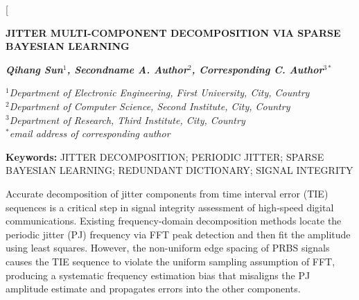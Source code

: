 \documentclass[10pt, a4paper, twocolumn]{article}
\begin{document}
\twocolumn[{

    \begin{center}
      {\fontsize{18pt}{20pt}\selectfont\textbf{JITTER MULTI-COMPONENT DECOMPOSITION VIA SPARSE BAYESIAN LEARNING}\par}

      \vspace{1.5em}

      {\fontsize{10pt}{12pt}\selectfont\textit{\textbf{Qihang Sun$^{1}$, Secondname A. Author$^{2}$, Corresponding C. Author$^{3*}$}}\par}

      \vspace{1em}

      {\fontsize{10pt}{12pt}\selectfont\textit{$^{1}$Department of Electronic Engineering, First University, City, Country\\
      $^{2}$Department of Computer Science, Second Institute, City, Country\\
      $^{3}$Department of Research, Third Institute, City, Country\\
      $^{*}$email address of corresponding author}\par}
    \end{center}

    \vspace{1.5em}

    \noindent\textbf{Keywords:} JITTER DECOMPOSITION; PERIODIC JITTER; SPARSE BAYESIAN LEARNING; REDUNDANT DICTIONARY; SIGNAL INTEGRITY\par

    \vspace{1.5em}

    \par
    \vspace{0.4em}

    \noindent Accurate decomposition of jitter components from time interval error (TIE) sequences is a critical step in signal integrity assessment of high-speed digital communications. Existing frequency-domain decomposition methods locate the periodic jitter (PJ) frequency via FFT peak detection and then fit the amplitude using least squares. However, the non-uniform edge spacing of PRBS signals causes the TIE sequence to violate the uniform sampling assumption of FFT, producing a systematic frequency estimation bias that misaligns the PJ amplitude estimate and propagates errors into the other components.

}
\end{document}
